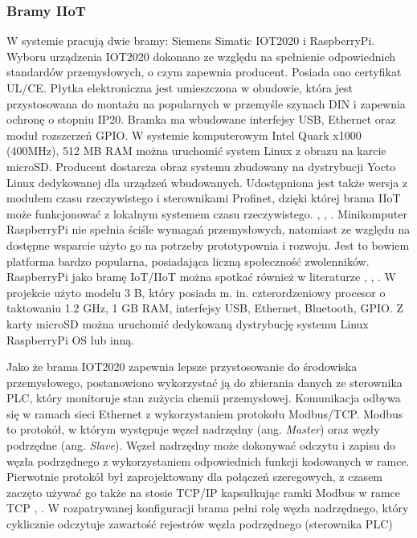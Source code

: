 \documentclass[a4paper, 12pt, twoside]{article}
\begin{document}
\subsubsection{Bramy IIoT}

W systemie pracują dwie bramy: Siemens Simatic IOT2020 i RaspberryPi. Wyboru urządzenia
IOT2020 dokonano ze względu na spełnienie odpowiednich standardów przemysłowych,
o czym zapewnia producent. Posiada ono certyfikat UL/CE. Płytka elektroniczna
jest umieszczona w obudowie, która jest przystosowana do montażu
na popularnych w przemyśle szynach DIN i zapewnia ochronę o stopniu IP20. Bramka
ma wbudowane interfejsy USB, Ethernet oraz moduł rozszerzeń GPIO. W systemie
komputerowym Intel Quark x1000 (400MHz), 512 MB RAM można uruchomić system
Linux z obrazu na karcie microSD. Producent dostarcza obraz systemu zbudowany
na dystrybucji Yocto Linux dedykowanej dla urządzeń wbudowanych. Udostępniona
jest także wersja z modułem czasu rzeczywistego i sterownikami Profinet,
dzięki której brama IIoT może funkcjonować z lokalnym systemem czasu rzeczywistego.
\cite{simatic-iot-sepc}, \cite{simatic-iot-profinet}, \cite{modbus-iot-gateway}.
Minikomputer RaspberryPi nie spełnia ściśle wymagań przemysłowych, natomiast ze
względu na dostępne wsparcie użyto go na potrzeby prototypownia i rozwoju.
Jest to bowiem platforma bardzo popularna, posiadająca liczną społeczność zwolenników.
RaspberryPi jako bramę IoT/IIoT można spotkać również w literaturze \cite{iiot-opensource-gateway},
\cite{design-impl-node-gateway}, \cite{low-cost-esp32-pi-node-red-scada}.
W projekcie użyto modelu 3 B, który posiada m. in. czterordzeniowy
procesor o taktowaniu 1.2 GHz, 1 GB RAM, interfejsy USB, Ethernet, Bluetooth, GPIO.
Z karty microSD można uruchomić dedykowaną dystrybucję systemu Linux RaspberryPi OS lub inną.

Jako że brama IOT2020 zapewnia lepsze przystosowanie do środowiska przemysłowego,
postanowiono wykorzystać ją do zbierania danych ze sterownika PLC, który
monitoruje stan zużycia chemii przemysłowej. Komunikacja odbywa się w ramach
sieci Ethernet z wykorzystaniem protokołu Modbus/TCP. Modbus to protokół,
w którym występuje węzeł nadrzędny (ang. \emph{Master}) oraz węzły
podrzędne (ang. \emph{Slave}). Węzeł nadrzędny może dokonywać odczytu i zapisu
do węzła podrzędnego z wykorzystaniem odpowiednich funkcji kodowanych w ramce.
Pierwotnie protokół był zaprojektowany dla połączeń szeregowych, z czasem
zaczęto używać go także na stosie TCP/IP kapsułkując ramki Modbus w ramce TCP
\cite{isp}, \cite{isp-analiza-przepływu-informacji}. W rozpatrywanej konfiguracji
brama pełni rolę węzła nadrzędnego, który cyklicznie odczytuje zawartość
rejestrów węzła podrzędnego (sterownika PLC)
\end{document}
